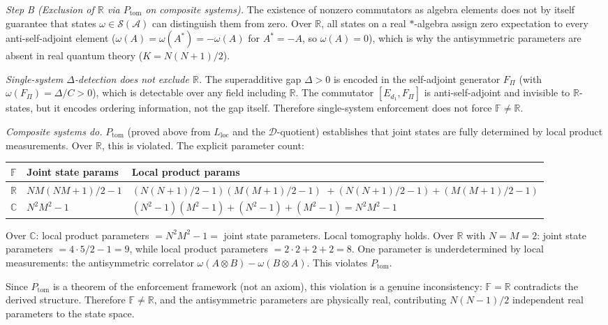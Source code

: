 \documentclass[11pt]{article}
\theoremstyle{remark}
\begin{document}
\begin{tcolorbox}[apfbox, title={T2c: Selection of the Complex Branch}]
\textit{Step B (Exclusion of $\mathbb{R}$ via $P_{\mathrm{tom}}$ on composite systems).}  The existence of nonzero commutators as algebra elements does not by itself guarantee that states $\omega \in \mathcal{S}(\mathcal{A})$ can distinguish them from zero.  Over $\mathbb{R}$, all states on a real $*$-algebra assign zero expectation to every anti-self-adjoint element ($\omega(A) = \omega(A^*) = -\omega(A)$ for $A^* = -A$, so $\omega(A) = 0$), which is why the antisymmetric parameters are absent in real quantum theory ($K = N(N+1)/2$).

\textit{Single-system $\Delta$-detection does not exclude $\mathbb{R}$.}  The superadditive gap $\Delta > 0$ is encoded in the self-adjoint generator $F_\Pi$ (with $\omega(F_\Pi) = \Delta/C > 0$), which is detectable over any field including $\mathbb{R}$.  The commutator $[E_{d_1}, F_\Pi]$ is anti-self-adjoint and invisible to $\mathbb{R}$-states, but it encodes ordering information, not the gap itself.  Therefore single-system enforcement does not force $\mathbb{F} \ne \mathbb{R}$.

\textit{Composite systems do.}  $P_{\mathrm{tom}}$ (proved above from $L_{\mathrm{loc}}$ and the $\mathcal{D}$-quotient) establishes that joint states are fully determined by local product measurements.  Over $\mathbb{R}$, this is violated.  The explicit parameter count:

\smallskip
\begin{center}
\small
\begin{tabular}{@{}lp{4.5cm}p{6.5cm}@{}}
$\mathbb{F}$ & Joint state params & Local product params \\
\hline
$\mathbb{R}$ & $NM(NM{+}1)/2 - 1$ & $(N(N{+}1)/2{-}1)(M(M{+}1)/2{-}1)$ ${}+ (N(N{+}1)/2{-}1) + (M(M{+}1)/2{-}1)$ \\
$\mathbb{C}$ & $N^2 M^2 - 1$ & $(N^2{-}1)(M^2{-}1) + (N^2{-}1) + (M^2{-}1) = N^2 M^2 - 1$ \\
\end{tabular}
\end{center}
\smallskip

Over $\mathbb{C}$: local product parameters $= N^2 M^2 - 1 =$ joint state parameters.  Local tomography holds.  Over $\mathbb{R}$ with $N = M = 2$: joint state parameters $= 4 \cdot 5/2 - 1 = 9$, while local product parameters $= 2 \cdot 2 + 2 + 2 = 8$.  One parameter is underdetermined by local measurements: the antisymmetric correlator $\omega(A \otimes B) - \omega(B \otimes A)$.  This violates $P_{\mathrm{tom}}$.

Since $P_{\mathrm{tom}}$ is a theorem of the enforcement framework (not an axiom), this violation is a genuine inconsistency: $\mathbb{F} = \mathbb{R}$ contradicts the derived structure.  Therefore $\mathbb{F} \ne \mathbb{R}$, and the antisymmetric parameters are physically real, contributing $N(N-1)/2$ independent real parameters to the state space.


\end{tcolorbox}
\end{document}
